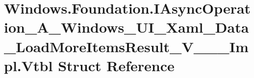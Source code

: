 \hypertarget{struct_windows_1_1_foundation_1_1_i_async_operation___a___windows___u_i___xaml___data___load_mor4757a93b106839c8518b7060ad515b5e}{}\section{Windows.\+Foundation.\+I\+Async\+Operation\+\_\+\+A\+\_\+\+Windows\+\_\+\+U\+I\+\_\+\+Xaml\+\_\+\+Data\+\_\+\+Load\+More\+Items\+Result\+\_\+\+V\+\_\+\+\_\+\+\_\+\+Impl.\+Vtbl Struct Reference}
\label{struct_windows_1_1_foundation_1_1_i_async_operation___a___windows___u_i___xaml___data___load_mor4757a93b106839c8518b7060ad515b5e}
